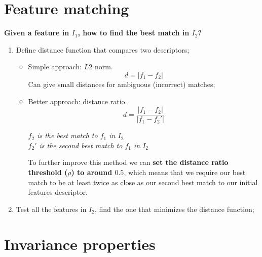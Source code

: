 \documentclass{article}
\begin{document}
\section*{Feature matching}

\textbf{Given a feature in $I_1$, how to find the best match in $I_2$?}

\begin{enumerate}
    \item Define distance function that compares two descriptors;
    \begin{itemize}
        \item Simple approach: $L2$ norm.
        \begin{equation*}
            d = |f_1 - f_2|
        \end{equation*}
        Can give small distances for ambiguous (incorrect) matches;
        \item Better approach: distance ratio.
        \begin{equation*}
            d = \frac{|f_1 - f_2|}{|f_1 - f_2'|}
        \end{equation*}
        \begin{center}
            \textit{$f_2$ is the best match to $f_1$ in $I_2$} \\
            \textit{$f_2'$ is the second best match to $f_1$ in $I_2$}
        \end{center}
        To further improve this method we can \textbf{set the distance ratio threshold ($\rho$) to around $0.5$}, which means that we require our best match to be at least twice as close as our second best match to our initial features descriptor. 
    \end{itemize}
    \item Test all the features in $I_2$, find the one that minimizes the distance function;
\end{enumerate}

\newpage

\section*{Invariance properties}
\end{document}

